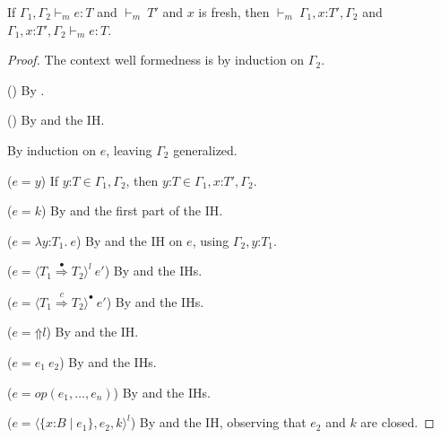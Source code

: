 \documentclass[9pt]{extarticle}
\newcommand{\ottnt}[1]{\mathit{#1}}
\newcommand{\ottmv}[1]{\mathit{#1}}
\newcommand{\ottsym}[1]{#1}
\begin{document}
\begin{lemma}[Weakening]
  \label{lem:weakening}
  If $ \Gamma_{{\mathrm{1}}}  \ottsym{,}  \Gamma_{{\mathrm{2}}}   \vdash _{ \ottnt{m} }  \ottnt{e}  :  \ottnt{T} $ and $ \mathord{  \vdash _{ \ottnt{m} } }~ \ottnt{T'} $ and $\mathit{x}$ is fresh, then
  $ \mathord{  \vdash _{ \ottnt{m} } }~  \Gamma_{{\mathrm{1}}} , \mathit{x} \mathord{:} \ottnt{T'}   \ottsym{,}  \Gamma_{{\mathrm{2}}} $ and $  \Gamma_{{\mathrm{1}}} , \mathit{x} \mathord{:} \ottnt{T'}   \ottsym{,}  \Gamma_{{\mathrm{2}}}   \vdash _{ \ottnt{m} }  \ottnt{e}  :  \ottnt{T} $.
{\iffull
  \begin{proof}
    The context well formedness is by induction on $\Gamma_{{\mathrm{2}}}$.
\item[(\WF{Empty})] By .
    \item[(\WF{Extend})] By  and the IH.

    By induction on $\ottnt{e}$, leaving $\Gamma_{{\mathrm{2}}}$ generalized.
\item[($\ottnt{e}  \ottsym{=}  \mathit{y}$)] If $ \mathit{y}  \mathord{:}  \ottnt{T}  \in  \Gamma_{{\mathrm{1}}}  \ottsym{,}  \Gamma_{{\mathrm{2}}} $, then $ \mathit{y}  \mathord{:}  \ottnt{T}  \in   \Gamma_{{\mathrm{1}}} , \mathit{x} \mathord{:} \ottnt{T'}   \ottsym{,}  \Gamma_{{\mathrm{2}}} $.
    \item[($\ottnt{e}  \ottsym{=}  \ottnt{k}$)] By  and the first part of the IH.
    \item[($\ottnt{e}  \ottsym{=}   \lambda \mathit{y} \mathord{:} \ottnt{T_{{\mathrm{1}}}} .~  \ottnt{e} $)] By  and the IH on $\ottnt{e}$, using
      $ \Gamma_{{\mathrm{2}}} , \mathit{y} \mathord{:} \ottnt{T_{{\mathrm{1}}}} $.
    \item[($\ottnt{e}  \ottsym{=}   \langle  \ottnt{T_{{\mathrm{1}}}}  \mathord{ \overset{\bullet}{\Rightarrow} }  \ottnt{T_{{\mathrm{2}}}}  \rangle^{ \ottnt{l} } ~  \ottnt{e'} $)] By  and the IHs.
    \item[($\ottnt{e}  \ottsym{=}   \langle  \ottnt{T_{{\mathrm{1}}}}  \mathord{ \overset{ \ottnt{c} }{\Rightarrow} }  \ottnt{T_{{\mathrm{2}}}}  \rangle^{\bullet} ~  \ottnt{e'} $)] By  and the IHs.
    \item[($\ottnt{e}  \ottsym{=}   \mathord{\Uparrow}  \ottnt{l} $)] By  and the IH.
    \item[($\ottnt{e}  \ottsym{=}   \ottnt{e_{{\mathrm{1}}}} ~ \ottnt{e_{{\mathrm{2}}}} $)] By  and the IHs.
    \item[($\ottnt{e}  \ottsym{=}  \ottnt{op}  \ottsym{(}  \ottnt{e_{{\mathrm{1}}}}  \ottsym{,}  \dots  \ottsym{,}  \ottnt{e_{\ottmv{n}}}  \ottsym{)}$)] By  and the IHs.
    \item[($\ottnt{e}  \ottsym{=}   \langle   \{ \mathit{x} \mathord{:} \ottnt{B} \mathrel{\mid} \ottnt{e_{{\mathrm{1}}}} \}  ,  \ottnt{e_{{\mathrm{2}}}} ,  \ottnt{k}  \rangle^{ \ottnt{l} } $)] By  and the IH,
      observing that $\ottnt{e_{{\mathrm{2}}}}$ and $\ottnt{k}$ are closed.
  \end{proof}
  \fi}
\end{lemma}
\end{document}
